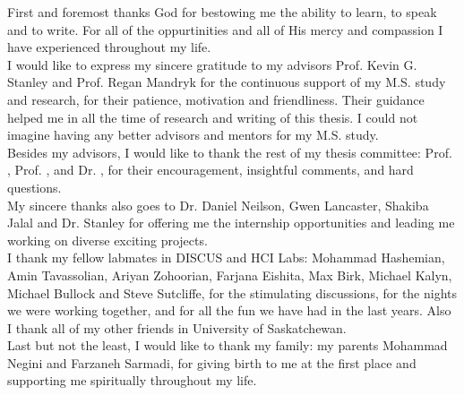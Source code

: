 First and foremost thanks God for bestowing me the ability to
learn, to speak and to write. For all of the oppurtinities and all of His mercy and compassion I have experienced throughout my life.\\

I would like to express my sincere gratitude to my advisors 
Prof. Kevin G. Stanley and Prof. Regan Mandryk for the continuous support of my M.S. study and research,
for their patience, motivation and friendliness.
Their guidance helped me in all the time of research and writing of this thesis.
I could not imagine having any better advisors and mentors for my M.S. study.\\

Besides my advisors, I would like to thank the rest of my thesis
committee: Prof. , Prof. , and Dr. , for their 
encouragement, insightful comments, and hard questions.\\

My sincere thanks also goes to Dr. Daniel Neilson, Gwen Lancaster,
Shakiba Jalal and Dr. Stanley for offering me the internship opportunities
and leading me working on diverse exciting projects.\\

I thank my fellow labmates in DISCUS and HCI Labs: Mohammad Hashemian, Amin Tavassolian,
Ariyan Zohoorian, Farjana Eishita, Max Birk, Michael Kalyn, Michael Bullock and Steve Sutcliffe,
for the stimulating discussions, for the nights we were working together,
and for all the fun we have had in the last years.
Also I thank all of my other friends in University of Saskatchewan.\\

Last but not the least, I would like to thank my family: my parents Mohammad Negini and
Farzaneh Sarmadi, for giving birth to me at the first place and supporting me spiritually
throughout my life.\\
